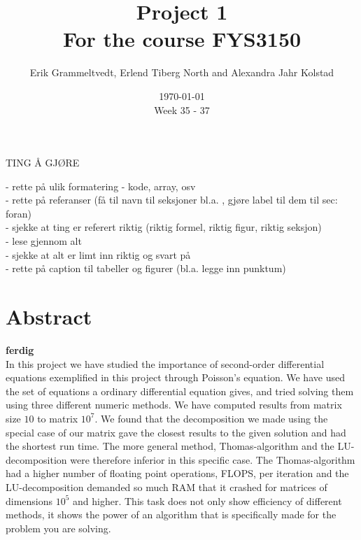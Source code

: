 \documentclass{article}
\begin{document}
\addtocounter{page}{0}

\title{Project 1 \\
      \large For the course FYS3150}
\date{\today \\
    \vspace{1mm}
    \large Week 35 - 37}

\author{Erik Grammeltvedt, Erlend Tiberg North and Alexandra Jahr Kolstad}

\maketitle

\vspace{1cm}

\tableofcontents

\vspace{1cm}
TING Å GJØRE

 - rette på ulik formatering - kode, array, osv \\
 - rette på referanser (få til navn til seksjoner bl.a. , gjøre label til dem til sec: foran) \\
 - sjekke at ting er referert riktig (riktig formel, riktig figur, riktig seksjon) \\
 - lese gjennom alt \\
 - sjekke at alt er limt inn riktig og svart på \\
 - rette på caption til tabeller og figurer (bl.a. legge inn punktum)




\section{Abstract} \label{sec:Abstract}

{\large \bf ferdig} \\

In this project we have studied the importance of second-order differential equations exemplified in this project through Poisson’s equation. We have used the set of equations a ordinary differential equation gives, and tried solving them using three different numeric methods. We have computed results from matrix size $10$ to matrix $10^7$. We found that the decomposition we made using the special case of our matrix gave the closest results to the given solution and had the shortest run time. The more general method, Thomas-algorithm and the LU-decomposition were therefore inferior in this specific case. The Thomas-algorithm had a higher number of floating point operations, FLOPS, per iteration and the LU-decomposition demanded so much RAM that it crashed for matrices of dimensions $10^5$ and higher. This task does not only show efficiency of different methods, it shows the power of an algorithm that is specifically made for the problem you are solving.
\end{document}
